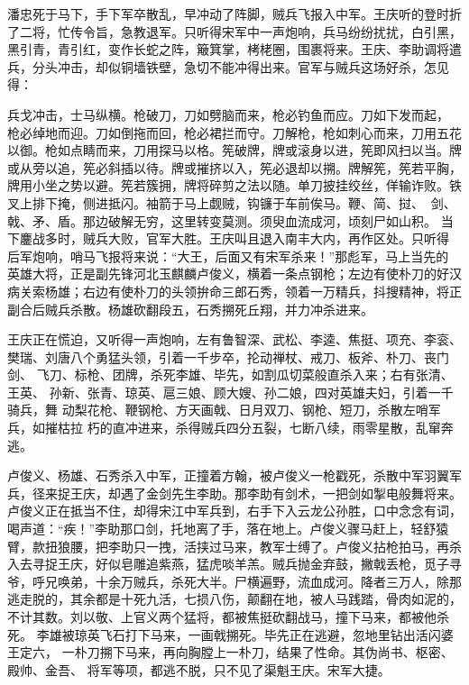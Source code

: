 潘忠死于马下，手下军卒散乱，早冲动了阵脚，贼兵飞报入中军。王庆听的登时折
了二将，忙传令旨，急教退军。只听得宋军中一声炮响，兵马纷纷扰扰，白引黑，
黑引青，青引红，变作长蛇之阵，簸箕掌，栲栳圈，围裹将来。王庆、李助调将遣
兵，分头冲击，却似铜墙铁壁，急切不能冲得出来。官军与贼兵这场好杀，怎见得：

兵戈冲击，士马纵横。枪破刀，刀如劈脑而来，枪必钓鱼而应。刀如下发而起，
枪必绰地而迎。刀如倒拖而回，枪必裙拦而守。刀解枪，枪如刺心而来，刀用五花
以御。枪如点睛而来，刀用探马以格。筅破牌，牌或滚身以进，筅即风扫以当。牌
或从旁以追，筅必斜插以待。牌或摧挤以入，筅必退却以搠。牌解筅，筅若平胸，
牌用小坐之势以避。筅若簇拥，牌将碎剪之法以随。单刀披挂绞丝，佯输诈败。铁
叉上排下掩，侧进抵闪。袖箭于马上觑贼，钩镰于车前俟马。鞭、简、挝、，剑、
戟、矛、盾。那边破解无穷，这里转变莫测。须臾血流成河，顷刻尸如山积。
当下鏖战多时，贼兵大败，官军大胜。王庆叫且退入南丰大内，再作区处。只听得
后军炮响，哨马飞报将来说：“大王，后面又有宋军杀来！”那彪军，马上当先的
英雄大将，正是副先锋河北玉麒麟卢俊义，横着一条点钢枪；左边有使朴刀的好汉
病关索杨雄；右边有使朴刀的头领拚命三郎石秀，领着一万精兵，抖搜精神，将正
副合后贼兵杀散。杨雄砍翻段五，石秀搠死丘翔，并力冲杀进来。

王庆正在慌迫，又听得一声炮响，左有鲁智深、武松、李逵、焦挺、项充、李衮、
樊瑞、刘唐八个勇猛头领，引着一千步卒，抡动禅杖、戒刀、板斧、朴刀、丧门剑、
飞刀、标枪、团牌，杀死李雄、毕先，如割瓜切菜般直杀入来；右有张清、王英、
孙新、张青、琼英、扈三娘、顾大嫂、孙二娘，四对英雄夫妇，引着一千骑兵，舞
动梨花枪、鞭钢枪、方天画戟、日月双刀、钢枪、短刀，杀散左哨军兵，如摧枯拉
朽的直冲进来，杀得贼兵四分五裂，七断八续，雨零星散，乱窜奔逃。

卢俊义、杨雄、石秀杀入中军，正撞着方翰，被卢俊义一枪戳死，杀散中军羽翼军
兵，径来捉王庆，却遇了金剑先生李助。那李助有剑术，一把剑如掣电般舞将来。
卢俊义正在抵当不住，却得宋江中军兵到，右手下入云龙公孙胜，口中念念有词，
喝声道：“疾！”李助那口剑，托地离了手，落在地上。卢俊义骤马赶上，轻舒猿
臂，款扭狼腰，把李助只一拽，活挟过马来，教军士缚了。卢俊义拈枪拍马，再杀
入去寻捉王庆，好似皂雕追紫燕，猛虎啖羊羔。贼兵抛金弃鼓，撇戟丢枪，觅子寻
爷，呼兄唤弟，十余万贼兵，杀死大半。尸横遍野，流血成河。降者三万人，除那
逃走脱的，其余都是十死九活，七损八伤，颠翻在地，被人马践踏，骨肉如泥的，
不计其数。刘以敬、上官义两个猛将，都被焦挺砍翻战马，撞下马来，都被他杀死。
李雄被琼英飞石打下马来，一画戟搠死。毕先正在逃避，忽地里钻出活闪婆王定六，
一朴刀搠下马来，再向胸膛上一朴刀，结果了性命。其伪尚书、枢密、殿帅、金吾、
将军等项，都逃不脱，只不见了渠魁王庆。宋军大捷。

